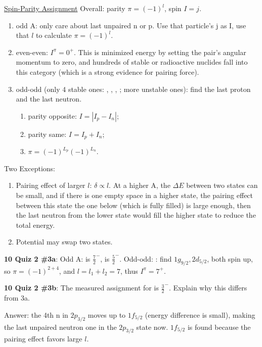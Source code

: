 \documentclass{school-22.101-notes}
\begin{document}
\clearpage
\uline{Spin-Parity Assignment}
Overall: parity $\pi = (-1)^l$, spin $I = j$. 
\begin{enumerate}
\item odd A: only care about last unpaired n or p. Use that particle's j as I, use that $l$ to calculate $\pi = (-1)^l$. 
\item even-even: $I^{\pi} = 0^+$. This is minimized energy by setting the pair's angular momentum to zero, and hundreds of stable or radioactive nuclides fall into this category (which is a strong evidence for pairing force). 
\item odd-odd (only 4 stable ones: , , , ; more unstable ones): find the last proton and the last neutron. 
    \begin{enumerate}
    \item parity opposite: $I = |I_p - I_n|$;
    \item parity same: $I = I_p + I_n$;
    \item $\pi = (-1)^{L_p} (-1)^{L_n}$. 
    \end{enumerate}
\end{enumerate}
Two Exceptions: 
\begin{enumerate}
\item Pairing effect of larger $l$: $\delta \propto l$. At a higher A, the $\Delta E$ between two states can be small, and if there is one empty space in a higher state, the pairing effect between this state the one below (which is fully filled) is large enough, then the last neutron from the lower state would fill the higher state to reduce the total energy. 
\item Potential may swap two states. 
\end{enumerate}


\textbf{10 Quiz 2 \#3a}: Odd A:  is $\frac{7}{2}^-$,  is $\frac{5}{2}^-$. Odd-odd: : find $1g_{9/2}, 2d_{5/2}$, both spin up, so $\pi = (-1)^{2+4}$, and $l = l_1 + l_2 = 7$, thus $I^{\pi} = 7^+$. 

\textbf{10 Quiz 2 \#3b}: The measured assignment for  is $\frac{3}{2}^-$. Explain why this differs from 3a. 

Answer: the 4th n in $2p_{3/2}$ moves up to $1f_{5/2}$ (energy difference is small), making the last unpaired neutron one in the $2p_{3/2}$ state now. $1f_{5/2}$ is found because the pairing effect favors large $l$. 
\end{document}
